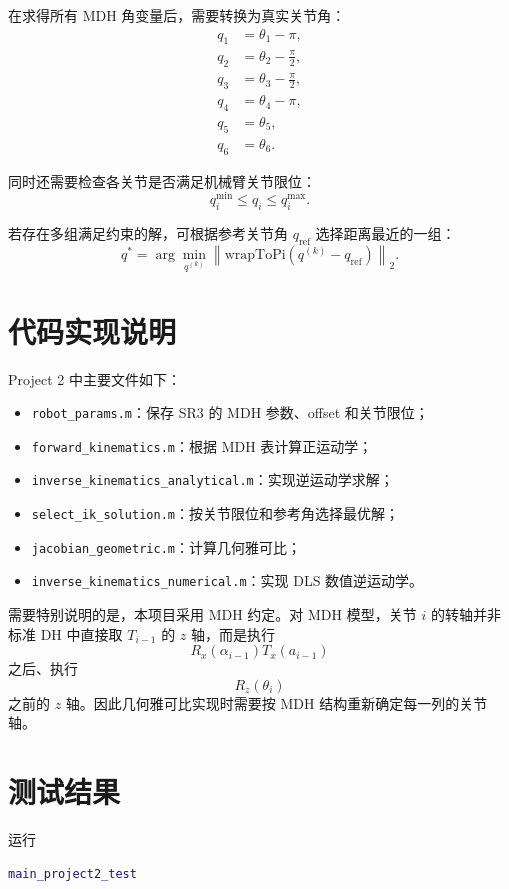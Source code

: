 \documentclass[UTF8,a4paper,12pt]{ctexart}
\begin{document}
在求得所有 MDH 角变量后，需要转换为真实关节角：
\[
\begin{aligned}
q_1&=\theta_1-\pi,\\
q_2&=\theta_2-\frac{\pi}{2},\\
q_3&=\theta_3-\frac{\pi}{2},\\
q_4&=\theta_4-\pi,\\
q_5&=\theta_5,\\
q_6&=\theta_6.
\end{aligned}
\]

同时还需要检查各关节是否满足机械臂关节限位：
\[
q_i^{\min}\le q_i\le q_i^{\max}.
\]

若存在多组满足约束的解，可根据参考关节角 $q_{\mathrm{ref}}$ 选择距离最近的一组：
\[
q^*
=
\arg\min_{q^{(k)}}
\left\|
\mathrm{wrapToPi}
\left(q^{(k)}-q_{\mathrm{ref}}\right)
\right\|_2.
\]

\section{代码实现说明}

Project 2 中主要文件如下：

\begin{itemize}
    \item \texttt{robot\_params.m}：保存 SR3 的 MDH 参数、offset 和关节限位；
    \item \texttt{forward\_kinematics.m}：根据 MDH 表计算正运动学；
    \item \texttt{inverse\_kinematics\_analytical.m}：实现逆运动学求解；
    \item \texttt{select\_ik\_solution.m}：按关节限位和参考角选择最优解；
    \item \texttt{jacobian\_geometric.m}：计算几何雅可比；
    \item \texttt{inverse\_kinematics\_numerical.m}：实现 DLS 数值逆运动学。
\end{itemize}

需要特别说明的是，本项目采用 MDH 约定。对 MDH 模型，关节 $i$ 的转轴并非
标准 DH 中直接取 $T_{i-1}$ 的 $z$ 轴，而是执行
\[
R_x(\alpha_{i-1})T_x(a_{i-1})
\]
之后、执行
\[
R_z(\theta_i)
\]
之前的 $z$ 轴。因此几何雅可比实现时需要按 MDH 结构重新确定每一列的关节轴。

\section{测试结果}

运行
\begin{lstlisting}[language=Matlab]
main_project2_test
\end{lstlisting}
\end{document}
